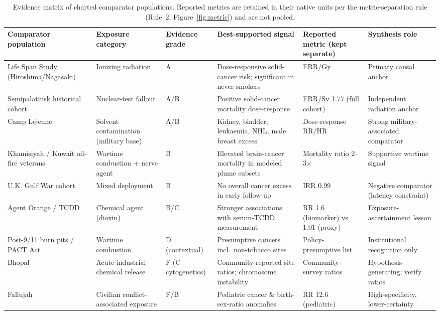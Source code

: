 \documentclass[3p,times]{elsarticle}
\begin{document}
\begin{table}[tbp]
\centering
\caption{Evidence matrix of charted comparator populations. Reported metrics are retained in their native units per the metric-separation rule (Rule~2, Figure~\ref{fig:metric}) and are not pooled.}
\label{tab:matrix}
\footnotesize
\setlength{\tabcolsep}{3.5pt}
\begin{tabular}{@{}L{0.15\textwidth}L{0.14\textwidth}L{0.07\textwidth}L{0.21\textwidth}L{0.14\textwidth}L{0.14\textwidth}@{}}
\toprule
Comparator population & Exposure category & Evidence grade & Best-supported signal & Reported metric (kept separate) & Synthesis role \\
\midrule
Life Span Study (Hiroshima/Nagasaki) & Ionizing radiation & A & Dose-responsive solid-cancer risk; significant in never-smokers & ERR/Gy & Primary causal anchor \\
Semipalatinsk historical cohort & Nuclear-test fallout & A/B & Positive solid-cancer mortality dose-response & ERR/Sv 1.77 (full cohort) & Independent radiation anchor \\
Camp Lejeune & Solvent contamination (military base) & A/B & Kidney, bladder, leukaemia, NHL, male breast excess & Dose-response RR/HR & Strong military-associated comparator \\
Khamisiyah / Kuwait oil-fire veterans & Wartime combustion + nerve agent & B & Elevated brain-cancer mortality in modeled plume subsets & Mortality ratio 2--3$\times$ & Supportive wartime signal \\
U.K. Gulf War cohort & Mixed deployment & B & No overall cancer excess in early follow-up & IRR 0.99 & Negative comparator (latency constraint) \\
Agent Orange / TCDD & Chemical agent (dioxin) & B/C & Stronger associations with serum-TCDD measurement & RR 1.6 (biomarker) vs 1.01 (proxy) & Exposure-ascertainment lesson \\
Post-9/11 burn pits / PACT Act & Wartime combustion & D (contextual) & Presumptive cancers incl.\ non-tobacco sites & Policy-presumptive list & Institutional recognition only \\
Bhopal & Acute industrial chemical release & F (C cytogenetics) & Community-reported site ratios; chromosome instability & Community-survey ratios & Hypothesis-generating; verify ratios \\
Fallujah & Civilian conflict-associated exposure & F/B & Pediatric cancer \& birth-sex-ratio anomalies & RR 12.6 (pediatric) & High-specificity, lower-certainty \\

\end{tabular}
\end{table}
\end{document}
